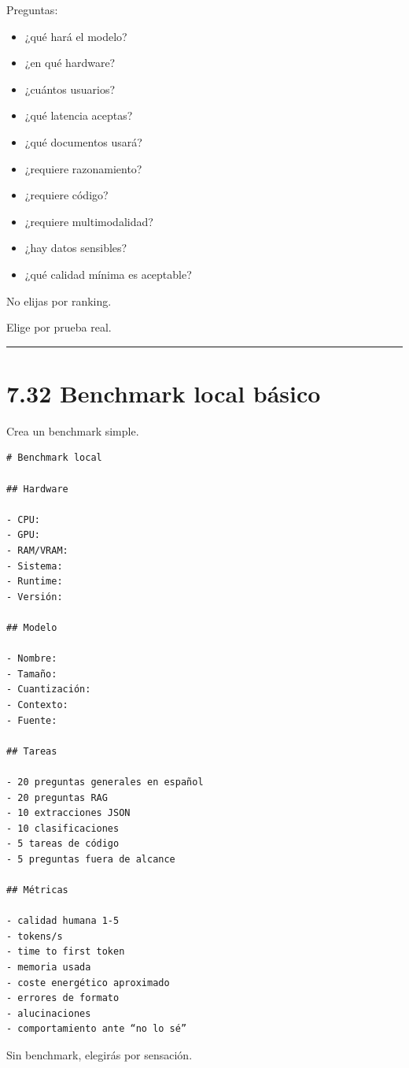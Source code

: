 Preguntas:

\begin{itemize}
\tightlist
\item
  ¿qué hará el modelo?
\item
  ¿en qué hardware?
\item
  ¿cuántos usuarios?
\item
  ¿qué latencia aceptas?
\item
  ¿qué documentos usará?
\item
  ¿requiere razonamiento?
\item
  ¿requiere código?
\item
  ¿requiere multimodalidad?
\item
  ¿hay datos sensibles?
\item
  ¿qué calidad mínima es aceptable?
\end{itemize}

No elijas por ranking.

Elige por prueba real.

\begin{center}\rule{0.5\linewidth}{0.5pt}\end{center}

\section{7.32 Benchmark local básico}\label{benchmark-local-buxe1sico}

Crea un benchmark simple.

\begin{lstlisting}
# Benchmark local

## Hardware

- CPU:
- GPU:
- RAM/VRAM:
- Sistema:
- Runtime:
- Versión:

## Modelo

- Nombre:
- Tamaño:
- Cuantización:
- Contexto:
- Fuente:

## Tareas

- 20 preguntas generales en español
- 20 preguntas RAG
- 10 extracciones JSON
- 10 clasificaciones
- 5 tareas de código
- 5 preguntas fuera de alcance

## Métricas

- calidad humana 1-5
- tokens/s
- time to first token
- memoria usada
- coste energético aproximado
- errores de formato
- alucinaciones
- comportamiento ante “no lo sé”
\end{lstlisting}

Sin benchmark, elegirás por sensación.

